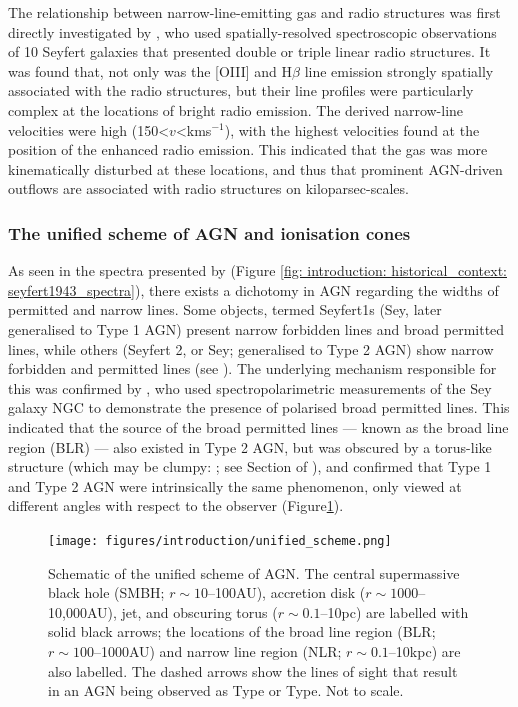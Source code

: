 The relationship between narrow-line-emitting gas and radio structures was first directly investigated by \citet{Whittle1988}, who used spatially-resolved spectroscopic observations of 10 Seyfert galaxies that presented double or triple linear radio structures. It was found that, not only was the [OIII] and H$\beta$ line emission strongly spatially associated with the radio structures, but their line profiles were particularly complex at the locations of bright radio emission. The derived narrow-line velocities were high (150\;\textless\;$v$\;\textless{}\;km\;s$^{-1}$), with the highest velocities found at the position of the enhanced radio emission. This indicated that the gas was more kinematically disturbed at these locations, and thus that prominent AGN-driven outflows are associated with radio structures on kiloparsec-scales.

\subsubsection{The unified scheme of AGN and ionisation cones}
\label{section: introduction: historical_context: nlr_studies: unified scheme}

As seen in the spectra presented by \citet{Seyfert1943} (Figure \ref{fig: introduction: historical_context: seyfert1943_spectra}), there exists a dichotomy in AGN regarding the widths of permitted and narrow lines. Some objects, termed Seyfert\;1s (Sey, later generalised to Type 1 AGN) present narrow forbidden lines and broad permitted lines, while others (Seyfert 2, or Sey; generalised to Type 2 AGN) show narrow forbidden and permitted lines (see \citealt{Khachikian1971}). The underlying mechanism responsible for this was confirmed by \citet{Antonucci1985}, who used spectropolarimetric measurements of the Sey galaxy NGC to demonstrate the presence of polarised broad permitted lines. This indicated that the source of the broad permitted lines --- known as the broad line region (BLR) --- also existed in Type 2 AGN, but was obscured by a torus-like structure (which may be clumpy: \citealt{Nenkova2002, Nenkova2008}; see Section of \citealt{Netzer2015}), and confirmed that Type 1 and Type 2 AGN were intrinsically the same phenomenon, only viewed at different angles with respect to the observer (Figure\;\ref{fig: introduction: historical_context: nlr_studies: unified_scheme}).

\begin{figure}[!ht]
    \centering
    \texttt{[image: figures/introduction/unified\_scheme.png]}
    \caption[Schematic of the unified scheme of AGN.]{Schematic of the unified scheme of AGN. The central supermassive black hole (SMBH; $r\sim10$--100\;AU), accretion disk ($r\sim1000$--10,000\;AU), jet, and obscuring torus ($r\sim0.1$--10\;pc) are labelled with solid black arrows; the locations of the broad line region (BLR; $r\sim100$--1000\;AU) and narrow line region (NLR; $r\sim0.1$--10\;kpc) are also labelled. The dashed arrows show the lines of sight that result in an AGN being observed as Type or Type. Not to scale.}
    \label{fig: introduction: historical_context: nlr_studies: unified_scheme}
\end{figure}

